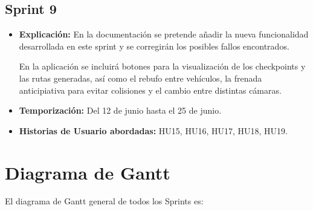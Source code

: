 \subsection{Sprint 9}

\begin{itemize}
    \item \textbf{Explicación:} En la documentación se pretende añadir la nueva funcionalidad desarrollada en este sprint y se corregirán los posibles fallos encontrados.
    
    En la aplicación se incluirá botones para la visualización de los checkpoints y las rutas generadas, así como el rebufo entre vehículos, la frenada anticipiativa para evitar colisiones y el cambio entre distintas cámaras.

    \item \textbf{Temporización:} Del 12 de junio hasta el 25 de junio.
    \item \textbf{Historias de Usuario abordadas:} HU15, HU16, HU17, HU18, HU19.
\end{itemize}


\newpage
\section{Diagrama de Gantt}

El diagrama de Gantt general de todos los Sprints es:


